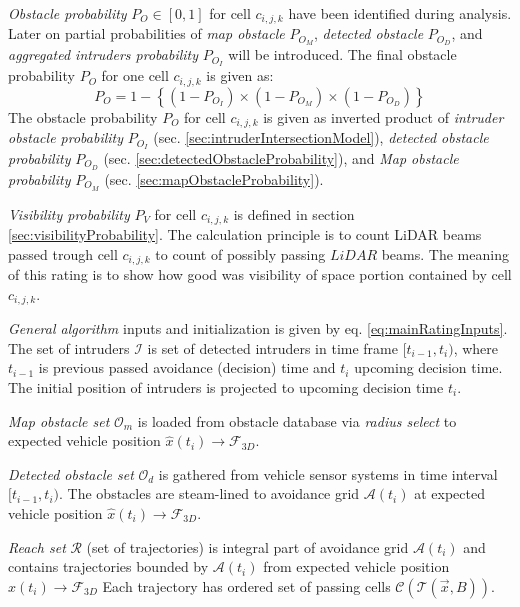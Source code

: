 \emph{Obstacle probability} $P_O\in[0,1]$ for cell $c_{i,j,k}$ have been identified during analysis. Later on partial probabilities of \emph{map obstacle} $P_{O_M}$, \emph{detected obstacle} $P_{O_D}$, and \emph{aggregated intruders probability} $P_{O_I}$ will be introduced. The final obstacle probability $P_O$ for one cell $c_{i,j,k}$ is given as:
\begin{equation}
    P_O = 1- \left \{ (1-P_{O_I})\times (1-P_{O_M}) \times (1-P_{O_D})\right \}
\end{equation}
\noindent The obstacle probability $P_O$ for cell $c_{i,j,k}$ is given as inverted product of \emph{intruder obstacle probability} $P_{O_I}$ (sec. \ref{sec:intruderIntersectionModel}), \emph{detected obstacle probability} $P_{O_D}$ (sec. \ref{sec:detectedObstacleProbability}), and \emph{Map obstacle probability} $P_{O_M}$ (sec. \ref{sec:mapObstacleProbability}).


\emph{Visibility probability} $P_V$ for cell $c_{i,j,k}$ is defined in section \ref{sec:visibilityProbability}. The calculation principle is to count LiDAR beams passed trough cell $c_{i,j,k}$ to count of possibly passing $LiDAR$ beams. The meaning of this rating is to show how good was visibility of space portion contained by cell $c_{i,j,k}$.

\emph{General algorithm} inputs and initialization is given by eq. \ref{eq:mainRatingInputs}. The set of intruders $\mathscr{I}$ is set of detected intruders in time frame $[t_{i-1},t_i)$, where $t_{i-1}$ is previous passed avoidance (decision) time and $t_i$ upcoming decision time. The initial position of intruders is projected to upcoming decision time $t_i$. 

\emph{Map obstacle set} $\mathscr{O}_m$ is loaded from obstacle database via \emph{radius select} to expected vehicle position $\hat{x}(t_i)\to\mathscr{F}_{3D}$.

\emph{Detected obstacle set} $\mathscr{O}_d$ is gathered from vehicle sensor systems in time interval $[t_{i-1},t_i)$. The obstacles are steam-lined to avoidance grid $\mathscr{A}(t_i)$ at expected vehicle position $\hat{x}(t_i)\to\mathscr{F}_{3D}$.

\emph{Reach set} $\mathscr{R}$ (set of trajectories) is integral part of avoidance grid $\mathscr{A}(t_i)$ and contains trajectories bounded by $\mathscr{A}(t_i)$ from expected vehicle position $\hat{x}(t_i)\to\mathscr{F}_{3D}$ Each trajectory has ordered set of passing cells $\mathscr{C}(\mathscr{T}(\vec{x},B))$.

